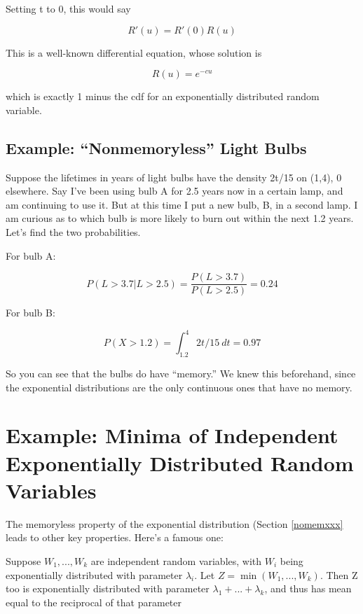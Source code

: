 Setting t to 0, this would say

\begin{equation}
R\prime(u) = R\prime(0) R(u)
\end{equation}

This is a well-known differential equation, whose solution is

\begin{equation}
R(u) = e^{-cu}
\end{equation}

which is exactly 1 minus the cdf for an exponentially distributed random
variable.

\subsection{Example:  ``Nonmemoryless'' Light Bulbs}

Suppose the lifetimes in years of light bulbs have the density 2t/15 on
(1,4), 0 elsewhere.  Say I've been using bulb A for 2.5 years now in a
certain lamp, and am continuing to use it.  But at this time I put a new
bulb, B, in a second lamp.  I am curious as to which bulb is more likely
to burn out within the next 1.2 years.  Let's find the two
probabilities.

For bulb A:

\begin{equation}
P(L > 3.7 | L > 2.5) =
\frac{P(L > 3.7)}{P(L > 2.5)} =
0.24
\end{equation}

For bulb B:

\begin{equation}
P(X > 1.2) = \int_{1.2}^{4} 2t/15 ~ dt = 0.97
\end{equation}

So you can see that the bulbs do have ``memory.''  We knew this
beforehand, since the exponential distributions are the only continuous
ones that have no memory.

\section{\label{min}Example:  Minima of Independent Exponentially
Distributed Random Variables}  
\label{minexp}

The memoryless property of the exponential distribution (Section
\ref{nomemxxx} leads to other key properties.  Here's a famous one:

\begin{theorem}
\label{thm1}

Suppose $W_{1},...,W_{k}$ are independent random variables, with $W_{i}$
being exponentially distributed with parameter $\lambda_{i}$.  Let
$Z=\min(W_{1},...,W_{k})$. Then Z too is exponentially distributed with
parameter $\lambda _{1}+...+\lambda_{k}$, and thus has mean equal to the
reciprocal of that parameter

\end{theorem}

